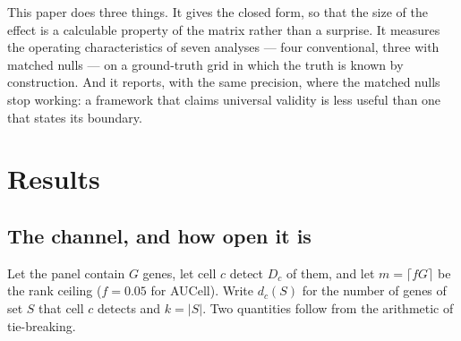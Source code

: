 \documentclass[11pt]{article}
\begin{document}
This paper does three things. It gives the closed form, so that the size of the
effect is a calculable property of the matrix rather than a surprise. It
measures the operating characteristics of seven analyses --- four conventional,
three with matched nulls --- on a ground-truth grid in which the truth is known
by construction. And it reports, with the same precision, where the matched
nulls stop working: a framework that claims universal validity is less useful
than one that states its boundary.

\section{Results}

\subsection{The channel, and how open it is}

Let the panel contain $G$ genes, let cell $c$ detect $D_c$ of them, and let
$m=\lceil fG\rceil$ be the rank ceiling ($f=0.05$ for AUCell). Write
$d_c(S)$ for the number of genes of set $S$ that cell $c$ detects and
$k=|S|$. Two quantities follow from the arithmetic of tie-breaking.
\end{document}
